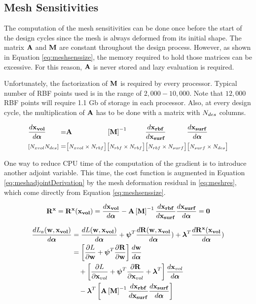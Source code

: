 \documentclass[letterpaper,12pt,]{article}
\begin{document}
\subsection*{Mesh Sensitivities}

The computation of the mesh sensitivities can be done once before the start of the design cycles since the mesh is always deformed from its initial shape.
The matrix $\mathbf{A}$ and $\mathbf{M}$ are constant throughout the design process.
However, as shown in Equation \ref{eq:meshsenssize}, the memory required to hold those matrices can be excessive.
For this reason, $\mathbf{A}$ is never stored and lazy evaluation is required.

Unfortunately, the factorization of $\mathbf{M}$ is required by every processor.
Typical number of RBF points used is in the range of $2,000-10,000$.
Note that $12,000$ RBF points will require 1.1 Gb of storage in each processor.
Also, at every design cycle, the multiplication of $\mathbf{A}$ has to be done with a matrix with $N_{des}$ columns.

\begin{equation}
\begin{alignedat}{6}
	&\dfrac{d\mathbf{x_{vol}}}{d\boldsymbol{\alpha}}
	&&=
	&& \mathbf{A}
	&& \left[\mathbf{M}\right]^{-1}      
	&& \dfrac{d\mathbf{x_{rbf}}}{d\mathbf{x_{surf}}} 
	&& \dfrac{d\mathbf{x_{surf}}}{d\boldsymbol{\alpha}}
\\	                   
	&\text{\footnotesize$\left[N_{xvol} N_{des} \right]$}
	&&=
	&& \text{\footnotesize$\left[ N_{xvol} \times N_{rbf} \right]$}
	&& \text{\footnotesize$\left[ N_{rbf} \times N_{rbf} \right]$}
	&& \text{\footnotesize$\left[ N_{rbf} \times N_{surf} \right]$}
	&& \text{\footnotesize$\left[ N_{surf} \times N_{des} \right]$}
\label{eq:meshsenssize}
\end{alignedat}
\end{equation}

One way to reduce CPU time of the computation of the gradient is to introduce another adjoint variable.
This time, the cost function is augmented in Equation \ref{eq:meshadjointDerivation} by the mesh deformation residual in \ref{eq:meshres}, which come directly from Equation \ref{eq:meshsenssize}.

\begin{equation}
	\mathbf{R}^{\mathbf{x}} 
	= \mathbf{R}^{\mathbf{x}}(\mathbf{x_{vol}}) 
	= \dfrac{d\mathbf{x_{vol}}}{d\boldsymbol{\alpha}} 
	- \mathbf{A}
	\left[\mathbf{M}\right]^{-1}
	\dfrac{d\mathbf{x_{rbf}}}{d\mathbf{x_{surf}}}
	\dfrac{d\mathbf{x_{surf}}}{d\boldsymbol{\alpha}}
	= \mathbf{0}
	\label{eq:meshres}
\end{equation}

\begin{equation}
\begin{split}
	\dfrac{dL_a( \mathbf{w}, \mathbf{x_{vol}} )}{d\boldsymbol{\alpha}} &= 
	\dfrac{dL( \mathbf{w}, \mathbf{x_{vol}} )}{d\boldsymbol{\alpha}} 
	+
	\boldsymbol{\psi}^T
	\dfrac{d\mathbf{R}( \mathbf{w}, \mathbf{x_{vol}} }{d\boldsymbol{\alpha}})
	+
	\boldsymbol{\lambda}^T
	\dfrac{d\mathbf{R}^{\mathbf{x}}(\mathbf{x_{vol}} }{d\boldsymbol{\alpha}})
\\
	&=
	\left[
		\dfrac{\partial L}{\partial\mathbf{w}}
		+
		\boldsymbol{\psi}^T
		\dfrac{\partial\mathbf{R}}{\partial\mathbf{w}}
	\right]
	\dfrac{d\mathbf{w}}{d\boldsymbol{\alpha}}
	\\
	&\quad+
	\left[
		\dfrac{\partial L}{\partial\mathbf{x}_{vol}}
		+
		\boldsymbol{\psi}^T
		\dfrac{\partial\mathbf{R}}{\partial\mathbf{x}_{vol}}
		+
		\boldsymbol{\lambda}^T
	\right]
	\dfrac{d\mathbf{x}_{vol}}{d\boldsymbol{\alpha}}
	\\
	&\quad-
	\boldsymbol{\lambda}^T
	\left[
		\mathbf{A}
		\left[\mathbf{M}\right]^{-1}
		\dfrac{d\mathbf{x_{rbf}}}{d\mathbf{x_{surf}}}
		\dfrac{d\mathbf{x_{surf}}}{d\boldsymbol{\alpha}}
	\right]
	\label{eq:meshadjointDerivation}
\end{split}
\end{equation}
\end{document}
